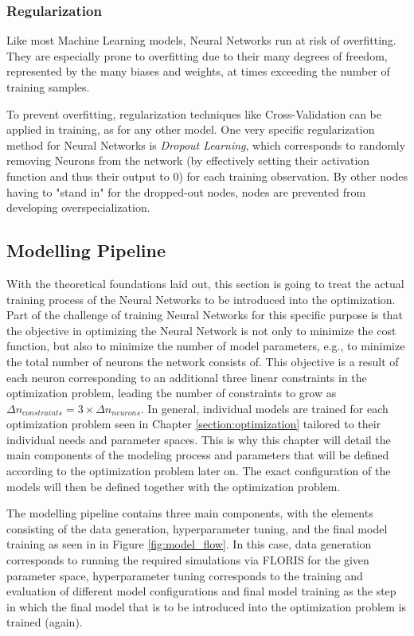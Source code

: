 \documentclass[preprint,12pt]{elsarticle}
\begin{document}
\subsubsection{Regularization}

Like most Machine Learning models, Neural Networks run at risk of overfitting. They are especially prone to overfitting due to their many degrees of freedom, represented by the many biases and weights, at times exceeding the number of training samples.

To prevent overfitting, regularization techniques like Cross-Validation can be applied in training, as for any other model. One very specific regularization method for Neural Networks is \textit{Dropout Learning}, which corresponds to randomly removing Neurons from the network (by effectively setting their activation function and thus their output to 0) for each training observation. By other nodes having to "stand in" for the dropped-out nodes, nodes are prevented from developing overspecialization. \cite{James2023}



\subsection{Modelling Pipeline} \label{sec:model_pipe}

With the theoretical foundations laid out, this section is going to treat the actual training process of the Neural Networks to be introduced into the optimization. Part of the challenge of training Neural Networks for this specific purpose is that the objective in optimizing the Neural Network is not only to minimize the cost function, but also to minimize the  number of model parameters, e.g., to minimize the total number of neurons the network consists of. This objective is a result of each neuron corresponding to an additional three linear constraints in the optimization problem, leading the number of constraints to grow as $\Delta n_{constraints} =3 \times \Delta n_{neurons}$. In general, individual models are trained for each optimization problem seen in Chapter \ref{section:optimization} tailored to their individual needs and parameter spaces. This is why this chapter will detail the main components of the modeling process and parameters that will be defined according to the optimization problem later on. The exact configuration of the models will then be defined together with the optimization problem.  

The modelling pipeline contains three main components, with the elements consisting of the data generation, hyperparameter tuning, and the final model training as seen in in Figure \ref{fig:model_flow}. In this case, data generation corresponds to running the required simulations via FLORIS  for the given parameter space, hyperparameter tuning corresponds to the training and evaluation of different model configurations and final model training as the step in which the final model that is to be introduced into the optimization problem is trained (again).
\end{document}
